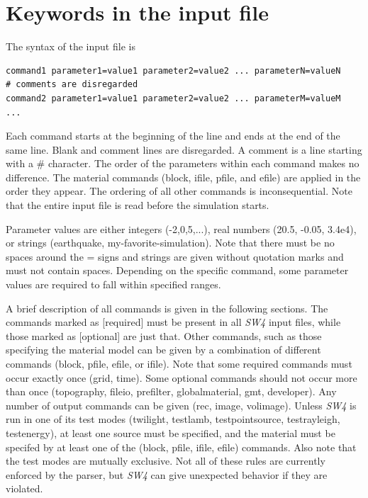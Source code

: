 \documentclass[11pt]{report}
\begin{document}



\chapter{Keywords in the input file}\label{chap:keywords}
The syntax of the input file is
\begin{verbatim}
command1 parameter1=value1 parameter2=value2 ... parameterN=valueN
# comments are disregarded
command2 parameter1=value1 parameter2=value2 ... parameterM=valueM
...
\end{verbatim}
Each command starts at the beginning of the line and ends at the end of the same line. Blank and
comment lines are disregarded. A comment is a line starting with a \# character. The order of the
parameters within each command makes no difference. The material commands (block, ifile, pfile, and efile)
are applied in the order they appear. The ordering of all other commands is inconsequential. Note
that the entire input file is read before the simulation starts.

Parameter values are either integers (-2,0,5,...), real numbers (20.5, -0.05, 3.4e4), or strings
(earthquake, my-favorite-simulation). Note that there must be no spaces around the = signs and
strings are given without quotation marks and must not contain spaces. Depending on the specific
command, some parameter values are required to fall within specified ranges.

A brief description of all commands is given in the following sections. The commands marked as
[required] must be present in all \emph{SW4} input files, while those marked as [optional] are just
that. Other commands, such as those specifying the material model can be given by a combination of
different commands (block, pfile, efile, or ifile). Note that some required commands must occur
exactly once (grid, time). Some optional commands should not occur more than once (topography,
fileio, prefilter, globalmaterial, gmt, developer). Any number of output commands can be given (rec,
image, volimage). Unless \emph{SW4} is run in one of its test modes (twilight, testlamb,
testpointsource, testrayleigh, testenergy), at least one source must be specified, and the material
must be specifed by at least one of the (block, pfile, ifile, efile) commands. Also note that the
test modes are mutually exclusive. Not all of these rules are currently enforced by the parser, but
\emph{SW4} can give unexpected behavior if they are violated.
\end{document}
